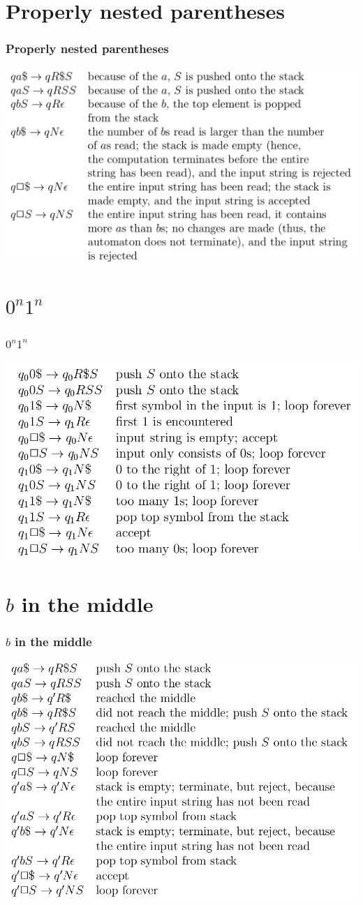 \documentclass{beamer}
\newcommand{\sect}[1]{
\section{#1}
\begin{frame}[fragile]\frametitle{#1}
}
\begin{document}
\sect{Properly nested parentheses}
\includegraphics[width=\textwidth]{nestedparens}
\end{frame}

\sect{$0^n1^n$}
\includegraphics[width=\textwidth]{0n1n}
\end{frame}

\sect{$b$ in the middle}
\includegraphics[width=\textwidth]{middleb}
\end{frame}
\end{document}
